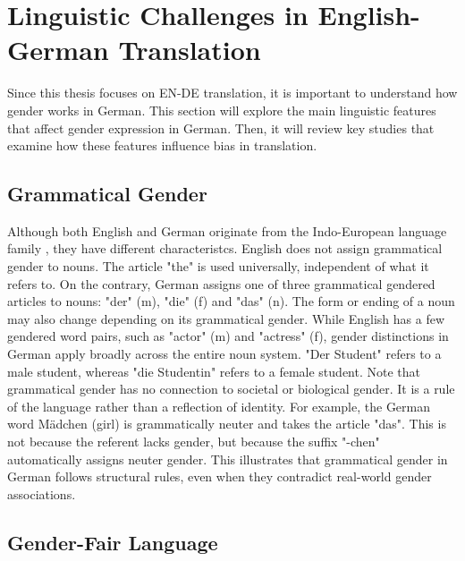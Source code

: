 \section{Linguistic Challenges in English-German Translation}

Since this thesis focuses on EN-DE translation, it is important to understand how gender works in German. This section will explore the main linguistic features that affect gender expression in German. Then, it will review key studies that examine how these features influence bias in translation.

\subsection{Grammatical Gender}
Although both English and German originate from the Indo-European language family \citep{baldiEnglishIndoEuropeanLanguage2008}, they have different characteristcs. English does not assign grammatical gender to nouns. The article "the" is used universally, independent of what it refers to. On the contrary, German assigns one of three grammatical gendered articles to nouns: "der" (m), "die" (f) and "das" (n). The form or ending of a noun may also change depending on its grammatical gender. While English has a few gendered word pairs, such as "actor" (m) and "actress" (f), gender distinctions in German apply broadly across the entire noun system. "Der Student" refers to a male student, whereas "die Studentin" refers to a female student. Note that grammatical gender has no connection to societal or biological gender. It is a rule of the language rather than a reflection of identity. For example, the German word Mädchen (girl) is grammatically neuter and takes the article "das". This is not because the referent lacks gender, but because the suffix "-chen" automatically assigns neuter gender. This illustrates that grammatical gender in German follows structural rules, even when they contradict real-world gender associations.

\subsection{Gender-Fair Language}

